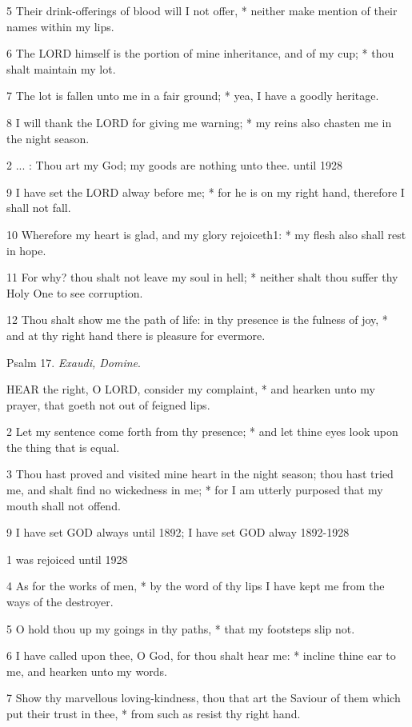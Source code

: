 5 Their drink-offerings of blood will I not offer,
* neither make mention of their names within my lips.

6 The LORD himself is the portion
of mine inheritance, and of my cup; * thou shalt maintain my lot.

7 The lot is fallen unto me in a fair ground; * yea,
I have a goodly heritage.

8 I will thank the LORD for
giving me warning; * my reins also chasten me in the night season.

2 ... : Thou art my God; my goods are nothing unto
thee. until
1928

9 I have set the LORD alway before me; * for
he is on my right hand, therefore I shall not fall.

10 Wherefore my heart is glad, and my glory rejoiceth1:
* my flesh also shall rest in hope.

11 For why? thou shalt not leave my soul in hell; * neither
shalt thou suffer thy Holy One to see corruption.

12 Thou shalt show me the path of life: in thy presence
is the fulness of joy, * and at thy right hand there is pleasure for evermore.

Psalm
17. \emph{Exaudi, Domine}.

HEAR
the right, O LORD, consider my complaint, * and
hearken unto my prayer, that goeth not out of feigned lips.

2 Let my sentence come forth from thy presence; * and
let thine eyes look upon the thing that is equal.

3 Thou hast proved and visited mine heart in the night
season; thou hast tried me, and shalt find no wickedness in me; * for
I am utterly purposed that my mouth shall not offend.

9 I have set GOD
always until
1892; I have set GOD alway 1892-1928

1 was rejoiced until
1928

4 As for the works of men, * by the word of thy lips I have kept
me from the ways of the destroyer.

5 O hold thou up my goings in thy paths, * that my footsteps
slip not.

6 I have called upon thee, O God, for thou shalt hear
me: * incline thine ear to me, and hearken unto my words.

7 Show thy marvellous loving-kindness, thou that art
the Saviour of them which put their trust in thee, * from such as resist
thy right hand.

